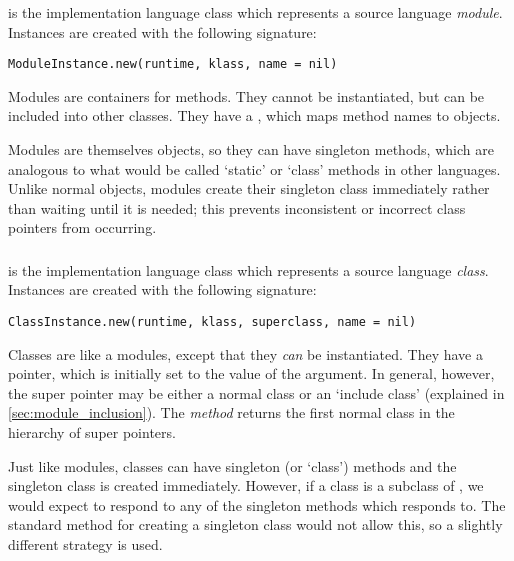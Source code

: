 \newpage
\subsubsection{}

 is the implementation language class which represents a source language \textit{module}. Instances are created with the following signature:

\begin{lstlisting}
ModuleInstance.new(runtime, klass, name = nil)
\end{lstlisting}

Modules are containers for methods. They cannot be instantiated, but can be included into other classes. They have a , which maps method names to  objects.

Modules are themselves objects, so they can have singleton methods, which are analogous to what would be called `static' or `class' methods in other languages. Unlike normal objects, modules create their singleton class immediately rather than waiting until it is needed; this prevents inconsistent or incorrect class pointers from occurring.

\subsubsection{}

 is the implementation language class which represents a source language \textit{class}. Instances are created with the following signature:

\begin{lstlisting}
ClassInstance.new(runtime, klass, superclass, name = nil)
\end{lstlisting}

Classes are like a modules, except that they \textit{can} be instantiated. They have a  pointer, which is initially set to the value of the  argument. In general, however, the super pointer may be either a normal class or an `include class' (explained in \autoref{sec:module_inclusion}). The  \textit{method} returns the first normal class in the hierarchy of super pointers.

Just like modules, classes can have singleton (or `class') methods and the singleton class is created immediately. However, if a class  is a subclass of , we would expect  to respond to any of the singleton methods which  responds to. The standard method for creating a singleton class would not allow this, so a slightly different strategy is used.

